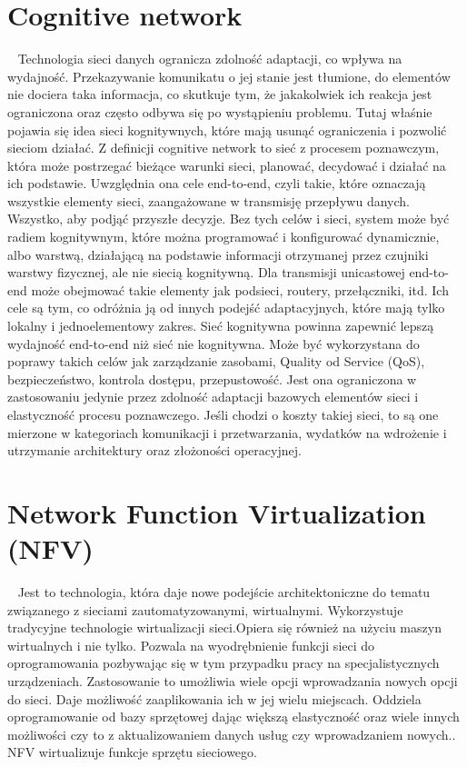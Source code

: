 \documentclass[sn-mathphys,Numbered]{sn-jnl}
\theoremstyle{thmstyleone}%
\theoremstyle{thmstyletwo}%
\theoremstyle{thmstylethree}%
\begin{document}
\section{Cognitive network}
~   Technologia sieci danych ogranicza zdolność adaptacji, co wpływa na wydajność. Przekazywanie komunikatu o jej stanie jest tłumione, do elementów nie dociera taka informacja, co skutkuje tym, że jakakolwiek ich reakcja jest ograniczona oraz często odbywa się po wystąpieniu problemu. Tutaj właśnie pojawia się idea sieci kognitywnych, które mają usunąć ograniczenia i pozwolić sieciom działać. Z definicji cognitive network to sieć z procesem poznawczym, która może postrzegać bieżące warunki sieci, planować, decydować i działać na ich podstawie. Uwzględnia ona cele end-to-end, czyli takie, które oznaczają wszystkie elementy sieci, zaangażowane w transmisję przepływu danych\cite{arslan_cognitive_2007}. Wszystko, aby podjąć przyszłe decyzje. Bez tych celów i sieci, system może być radiem kognitywnym, które można programować i konfigurować dynamicznie, albo warstwą, działającą na podstawie informacji otrzymanej przez czujniki warstwy fizycznej, ale nie siecią kognitywną. Dla transmisji unicastowej end-to-end może obejmować takie elementy jak podsieci, routery, przełączniki, itd. Ich cele są tym, co odróżnia ją od innych podejść adaptacyjnych, które mają tylko lokalny i jednoelementowy zakres. Sieć kognitywna powinna zapewnić lepszą wydajność end-to-end niż sieć nie kognitywna. Może być wykorzystana do poprawy takich celów jak zarządzanie zasobami, Quality od Service (QoS), bezpieczeństwo, kontrola dostępu, przepustowość. Jest ona ograniczona w zastosowaniu jedynie przez zdolność adaptacji bazowych elementów sieci i elastyczność procesu poznawczego. Jeśli chodzi o koszty takiej sieci, to są one mierzone w kategoriach komunikacji i przetwarzania, wydatków na wdrożenie i utrzymanie architektury oraz złożoności operacyjnej\cite{arslan_cognitive_2007}.

\section{Network Function Virtualization (NFV)}
~   Jest to technologia, która daje nowe podejście architektoniczne do tematu związanego z sieciami zautomatyzowanymi, wirtualnymi. Wykorzystuje tradycyjne technologie wirtualizacji sieci.Opiera się również na  użyciu maszyn wirtualnych i nie tylko. Pozwala na wyodrębnienie funkcji sieci do oprogramowania pozbywając się w tym przypadku pracy na specjalistycznych urządzeniach. Zastosowanie to umożliwia wiele opcji wprowadzania nowych opcji do sieci. Daje możliwość zaaplikowania ich w jej wielu miejscach. Oddziela oprogramowanie od bazy sprzętowej dając większą elastyczność oraz wiele innych możliwości czy to z aktualizowaniem danych usług czy wprowadzaniem nowych.\cite{yong_li_software-defined_2015}. 
NFV wirtualizuje funkcje sprzętu sieciowego\cite{kaur_architectural_2020}.
\end{document}
